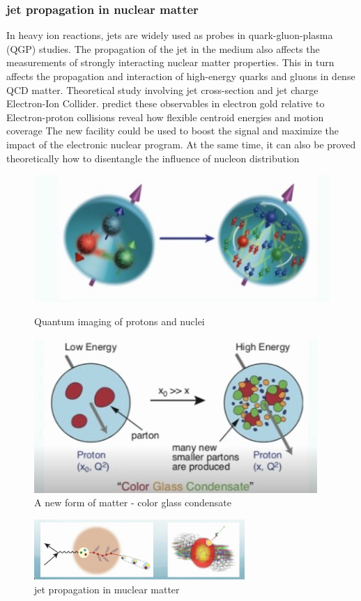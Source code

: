 \documentclass[12pt, a4paper, oneside]{article}
\begin{document}
\begin{spacing}{2.0}
\subsubsection{jet propagation in nuclear matter}
In heavy ion reactions, jets are widely used as probes in quark-gluon-plasma (QGP) studies.
The propagation of the jet in the medium also affects the measurements of strongly interacting nuclear matter properties.
This in turn affects the propagation and interaction of high-energy quarks and gluons in dense QCD matter. \cite{Ovanesyan_2011}
Theoretical study involving jet cross-section and jet charge
Electron-Ion Collider. predict these observables in electron gold relative to
Electron-proton collisions reveal how flexible centroid energies and motion coverage
The new facility could be used to boost the signal and maximize the impact of the electronic nuclear program.
At the same time, it can also be proved theoretically how to disentangle the influence of nucleon distribution\cite{PhysRevLett.126.252001}
\begin{figure}
    \begin{minipage}[t]{0.5\linewidth}
        \centering
        \includegraphics[scale=0.3]{kappa.jpg}
        \caption{Quantum imaging of protons and nuclei}
        \label{fig:side:a}
      \end{minipage}%
      \begin{minipage}[t]{0.5\linewidth}
        \centering
        \includegraphics[scale=0.3]{mu.jpg}
        \caption{A new form of matter - color glass condensate}
        \label{fig:side:b}
      \end{minipage}
\end{figure}
\begin{figure}
    \centering
    \includegraphics[width=8cm]{nu.jpg}
    \caption{jet propagation in muclear matter}
\end{figure}


\end{spacing}
\end{document}

